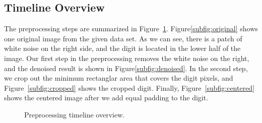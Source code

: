 \documentclass{article}
\begin{document}
\subsection{Timeline Overview}
The preprocessing steps are summarized in Figure~\ref{fig:preoverview}. Figure\ref{subfig:original} shows one original image from the given data set. As we can see, there is a patch of white noise on the right side, and the digit is located in the lower half of the image. Our first step in the preprocessing removes the white noise on the right, and the denoised result is shown in Figure\ref{subfig:denoised}. In the second step, we crop out the minimum rectanglar area that covers the digit pixels, and Figure~\ref{subfig:cropped} shows the cropped digit. Finally, Figure~\ref{subfig:centered} shows the centered image after we add equal padding to the digit. 

\begin{figure}[!htb]
	\centering
	\caption{Preprocessing timeline overview.}
	\label{fig:preoverview}
\end{figure}
\end{document}
